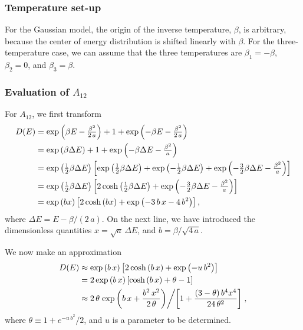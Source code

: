 \documentclass[aip,jcp,preprint,notitlepage, superscriptaddress]{revtex4-1}
\begin{document}
\subsubsection{Temperature set-up}



For the Gaussian model,
the origin of the inverse temperature, $\beta$,
is arbitrary,
because the center of
energy distribution is shifted linearly with $\beta$.
%
For the three-temperature case,
we can assume that the three temperatures are
$\beta_1 = -\beta$,
$\beta_2 = 0$,
and
$\beta_3 = \beta$.



\subsubsection{Evaluation of $A_{12}$}



For $A_{12}$,
we first transform
\begin{align}
D(E)
&=
\exp\left(
  \beta E - \tfrac{ \beta^2 }{ 2 \, a }
\right)
+
1
+
\exp\left(
  -\beta E - \tfrac{ \beta^2 }{ 2 \, a }
\right)
\notag \\
&=
\exp\left(
  \beta \Delta E
\right)
+
1
+
\exp\left(
  -\beta \Delta E - \tfrac{ \beta^2 }{ a }
\right)
\notag \\
&=
\exp\left(
  \tfrac 1 2 \beta \Delta E
\right)
\left[
\exp\left(
  \tfrac 1 2 \beta \Delta E
\right)
+
\exp\left(
  -\tfrac 1 2 \beta \Delta E
\right)
+
\exp\left(
  -\tfrac 3 2 \beta \Delta E
  - \tfrac{ \beta^2 }{ a }
\right)
\right]
\notag \\
&=
\exp\left(
  \tfrac 1 2 \beta \Delta E
\right)
\left[
2 \cosh\left(
  \tfrac 1 2 \beta \Delta E
\right)
+
\exp\left(
  -\tfrac 3 2 \beta \Delta E
  - \tfrac{ \beta^2 }{ a }
\right)
\right]
\notag \\
&=
\exp\left(
  b x
\right)
\left[
2 \cosh\left(
  b x
\right)
+
\exp\left(
  -3 \, b \, x
  -4 \, b^2
\right)
\right],
\label{eq:DE_threeT_exact}
\end{align}
%
where $\Delta E = E - \beta/(2 \, a)$.
%
On the next line,
we have introduced
the dimensionless quantities
$x = \sqrt{a} \, \Delta E$,
and
$b = \beta / \sqrt{4 \, a}$.


We now make an approximation
\begin{align}
D(E)
&\approx
\exp\left(
  b \, x
\right)
\left[
2 \cosh\left(
  b \, x
\right)
+
\exp\left(
  - u \, b^2
\right)
\right]
\label{eq:DE_threeT_approx1}
\\
&=
2 \exp\left(
  b \, x
\right)
\left[
\cosh\left(
  b \, x
\right)
+
\theta - 1
\right]
\notag \\
&\approx
2 \, \theta
\left.
  \exp\left(
    b \, x
    +
    \frac{ b^2 \, x^2 }
    {2 \, \theta}
  \right)
\middle/
\left[
  1
  +
  \frac{ (3 - \theta) \, b^4 x^4 }
  { 24 \, \theta^2 }
\right]
\right.
,
\label{eq:DE_threeT_approx}
\end{align}
%
where
$\theta \equiv 1 + e^{-u \, b^2}/2$,
%
and
$u$ is a parameter to be determined.
\end{document}
